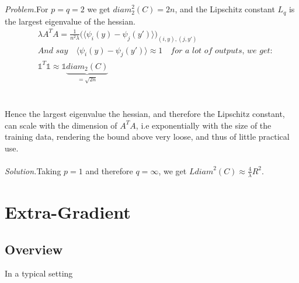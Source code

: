 \documentclass{article}
\begin{document}
\\
\\
\textit{Problem.}\quad For $p= q= 2$ we get $\textit{diam}_{2}^{2}(C)= 2n$, and the Lipschitz constant $L_{q}$ is the largest eigenvalue of the hessian.
\begin{equation*}
\begin{aligned}
    &\lambda A^{T}A= \frac{1}{n^{2}\lambda}\Big(\langle \psi_{i}(y)- \psi_{j}(y\prime) \rangle\Big)_{(i,y),(j,y\prime)}\\
    &\textit{And say}\quad \langle \psi_{i}(y)- \psi_{j}(y\prime) \rangle \approx  1\quad\textit{for a lot of outputs, we get:}\\
    &\mathbb{1}^{T}\mathbb{1}\approx \mathbb{1}\underbrace{diam_{2}(C)}_{=\sqrt{2n}}
\end{aligned} 
\end{equation*}
\\
\\
Hence the largest eigenvalue the hessian, and therefore the Lipschitz constant, can scale with the dimension of $A^{T}A$, i.e exponentially with the size of the training data, rendering the bound above very loose, and thus of little practical use.
\\
\\
\textit{Solution.}\quad Taking $p=1$ and therefore $q=\infty$, we get $L\textit{diam}^{2}(C)\approx \frac{4}{\lambda}R^{2}$.
\\

\newpage
\section{Extra-Gradient}
\subsection{Overview}
In a typical setting 
\end{document}
